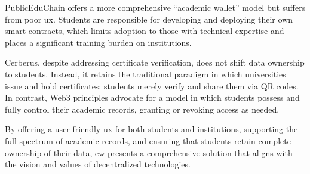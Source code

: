 PublicEduChain offers a more comprehensive “academic wallet” model but suffers from poor \acrfull{ux}. Students are responsible for developing and deploying their own smart contracts, which limits adoption to those with technical expertise and places a significant training burden on institutions.

Cerberus, despite addressing certificate verification, does not shift data ownership to students. Instead, it retains the traditional paradigm in which universities issue and hold certificates; students merely verify and share them via QR codes. In contrast, Web3 principles advocate for a model in which students possess and fully control their academic records, granting or revoking access as needed.

By offering a user-friendly \acrshort{ux} for both students and institutions, supporting the full spectrum of academic records, and ensuring that students retain complete ownership of their data, \acrshort{ew} presents a comprehensive solution that aligns with the vision and values of decentralized technologies.

